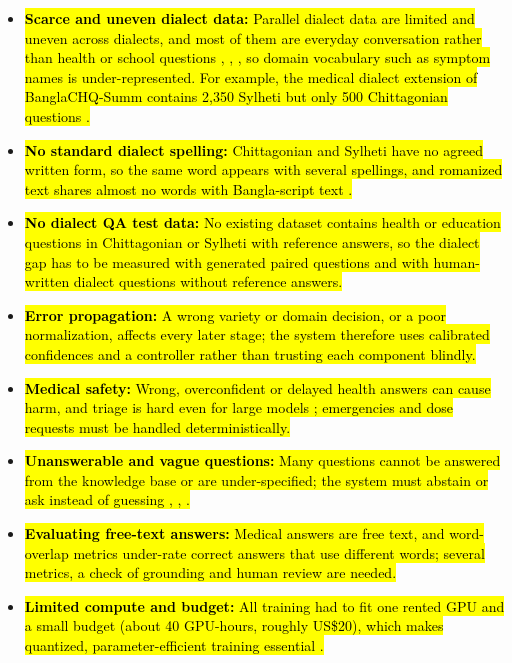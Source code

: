 \begin{itemize}
\item \hl{\textbf{Scarce and uneven dialect data:} Parallel dialect data are
limited and uneven across dialects, and most of them are everyday
conversation rather than health or school questions \cite{faria2023vashantor}, \cite{prantik2025},
\cite{kothon2026}, so domain vocabulary such as symptom names is
under-represented. For example, the medical dialect extension of
BanglaCHQ-Summ contains 2,350 Sylheti but only 500 Chittagonian
questions \cite{prantik2025}.}

\item \hl{\textbf{No standard dialect spelling:} Chittagonian and Sylheti
have no agreed written form, so the same word appears with several
spellings, and romanized text shares almost no words with Bangla-script
text \cite{jawad2026fivedialects}.}

\item \hl{\textbf{No dialect QA test data:} No existing dataset contains
health or education questions in Chittagonian or Sylheti with reference
answers, so the dialect gap has to be measured with generated paired
questions and with human-written dialect questions without reference
answers.}

\item \hl{\textbf{Error propagation:} A wrong variety or domain decision, or
a poor normalization, affects every later stage; the system therefore
uses calibrated confidences and a controller rather than trusting each
component blindly.}

\item \hl{\textbf{Medical safety:} Wrong, overconfident or delayed health
answers can cause harm, and triage is hard even for large models
\cite{saha2026doctalkbn}; emergencies and dose requests must be handled
deterministically.}

\item \hl{\textbf{Unanswerable and vague questions:} Many questions cannot
be answered from the knowledge base or are under-specified; the system
must abstain or ask instead of guessing \cite{rajpurkar2018squad2}, \cite{kamath2020selective}, \cite{nctbqa}.}

\item \hl{\textbf{Evaluating free-text answers:} Medical answers are free
text, and word-overlap metrics under-rate correct answers that use
different words; several metrics, a check of grounding and human review
are needed.}

\item \hl{\textbf{Limited compute and budget:} All training had to fit one
rented GPU and a small budget (about 40 GPU-hours, roughly US\$20),
which makes quantized, parameter-efficient training essential \cite{dettmers2023qlora}.}
\end{itemize}
